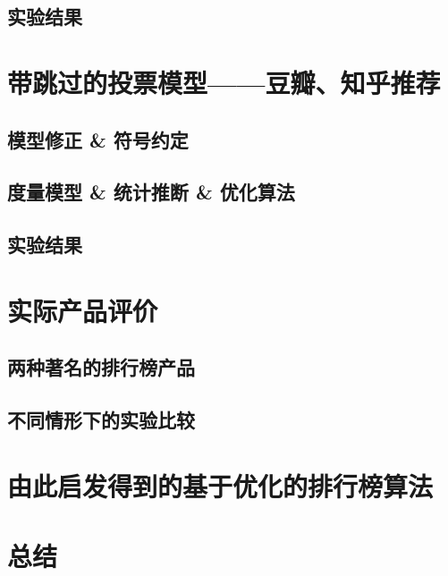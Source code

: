 \documentclass[UTF8]{ctexart}
\begin{document}
	\subsection{实验结果}
	\section{带跳过的投票模型——豆瓣、知乎推荐}
	\subsection{模型修正 \& 符号约定}
	\subsection{度量模型 \& 统计推断 \& 优化算法}
	\subsection{实验结果}
	\section{实际产品评价}
	\subsection{两种著名的排行榜产品}
	\subsection{不同情形下的实验比较}
	\section{由此启发得到的基于优化的排行榜算法}
	\section{总结}
	
\end{document}
